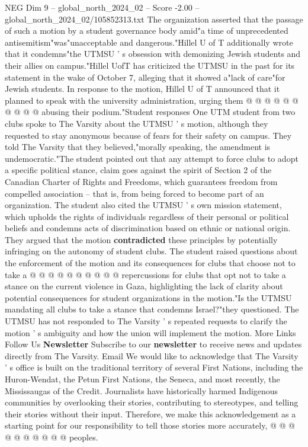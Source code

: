 \begin{textsample}{NEG Dim 9 – global\_north\_2024\_02 – Score -2.00 – global\_north\_2024\_02/105852313.txt}
The organization asserted that the passage of such a motion by a student governance body amid"a time of unprecedented antisemitism"was"unacceptable and dangerous."Hillel U of T additionally wrote that it condemns"the UTMSU ' s obsession with demonizing Jewish students and their allies on campus."Hillel UofT has criticized the UTMSU in the past for its statement in the wake of October 7, alleging that it showed a"lack of care"for Jewish students.
In response to the motion, Hillel U of T announced that it planned to speak with the university administration, urging them @ @ @ @ @ @ @ @ @ @ abusing their podium."Student responses One UTM student from two clubs spoke to The Varsity about the UTMSU ' s motion, although they requested to stay anonymous because of fears for their safety on campus.
They told The Varsity that they believed,"morally speaking, the amendment is undemocratic."The student pointed out that any attempt to force clubs to adopt a specific political stance, claim goes against the spirit of Section 2 of the Canadian Charter of Rights and Freedoms, which guarantees freedom from compelled association -- that is, from being forced to become part of an organization.
The student also cited the UTMSU ' s own mission statement, which upholds the rights of individuals regardless of their personal or political beliefs and condemns acts of discrimination based on ethnic or national origin.
They argued that the motion \textbf{contradicted} these principles by potentially infringing on the autonomy of student clubs.
The student raised questions about the enforcement of the motion and its consequences for clubs that choose not to take a @ @ @ @ @ @ @ @ @ @ repercussions for clubs that opt not to take a stance on the current violence in Gaza, highlighting the lack of clarity about potential consequences for student organizations in the motion."Is the UTMSU mandating all clubs to take a stance that condemns Israel?"they questioned.
The UTMSU has not responded to The Varsity ' s repeated requests to clarify the motion ' s ambiguity and how the union will implement the motion.
More Links Follow Us \textbf{Newsletter} Subscribe to our \textbf{newsletter} to receive news and updates directly from The Varsity.
Email We would like to acknowledge that The Varsity ' s office is built on the traditional territory of several First Nations, including the Huron-Wendat, the Petun First Nations, the Seneca, and most recently, the Mississaugas of the Credit.
Journalists have historically harmed Indigenous communities by overlooking their stories, contributing to stereotypes, and telling their stories without their input.
Therefore, we make this acknowledgement as a starting point for our responsibility to tell those stories more accurately, @ @ @ @ @ @ @ @ @ @ peoples.

\end{textsample}
